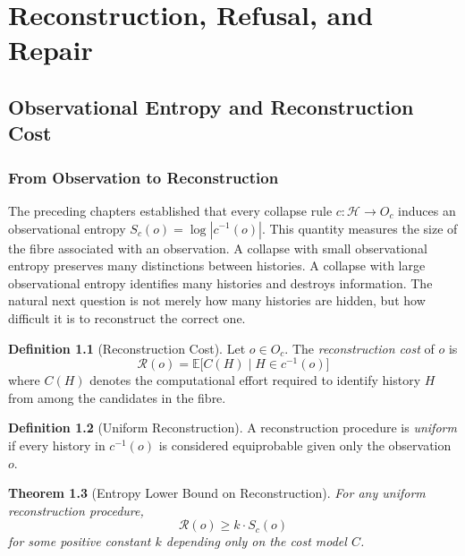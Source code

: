 \documentclass[12pt, a4paper, openany]{book}
\theoremstyle{plain}
\newtheorem{theorem}{Theorem}[chapter]
\theoremstyle{definition}
\newtheorem{definition}[theorem]{Definition}
\theoremstyle{remark}
\newcommand{\calH}{\mathcal{H}}
\newcommand{\calR}{\mathcal{R}}
\begin{document}

\part{Reconstruction, Refusal, and Repair}

\chapter{Observational Entropy and Reconstruction Cost}

\section{From Observation to Reconstruction}

The preceding chapters established that every collapse rule
$c : \calH \to O_c$ induces an observational entropy
$S_c(o) = \log |c^{-1}(o)|$.
This quantity measures the size of the fibre associated with an
observation. A collapse with small observational entropy preserves many
distinctions between histories. A collapse with large observational entropy
identifies many histories and destroys information. The natural next question is
not merely how many histories are hidden, but how difficult it is to reconstruct
the correct one.

\begin{definition}[Reconstruction Cost]
Let $o \in O_c$. The \emph{reconstruction cost} of $o$ is
\[
\calR(o) = \mathbb{E}\bigl[C(H) \mid H \in c^{-1}(o)\bigr]
\]
where $C(H)$ denotes the computational effort required to identify history $H$
from among the candidates in the fibre.
\end{definition}

\begin{definition}[Uniform Reconstruction]
A reconstruction procedure is \emph{uniform} if every history in $c^{-1}(o)$
is considered equiprobable given only the observation $o$.
\end{definition}

\begin{theorem}[Entropy Lower Bound on Reconstruction]
For any uniform reconstruction procedure,
\[
\calR(o) \geq k \cdot S_c(o)
\]
for some positive constant $k$ depending only on the cost model $C$.
\end{theorem}
\end{document}
